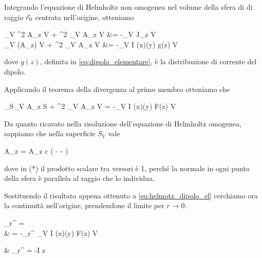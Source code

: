 Integrando l'equazione di Helmholtz non omogenea nel volume della sfera di di raggio $\vec{r}_0$ centrata nell'origine, otteniamo
\begin{esp*}
	\int_V \nabla^2 A_z \de V + \omega^2 \mu \epsilon \int_V A_z \de V &= -\mu \int_V J_z \de V \\
	\int_V \diverg(\nabla A_z) \de V + \omega^2 \mu \epsilon \int_V A_z \de V &= -\mu \int_V I \delta(x)\delta(y) g(z) \de V
\end{esp*}
dove $g(z)$, definita in \autoref{eq:dipolo_elementare}, è la distribuzione di corrente del dipolo.

Applicando il teorema della divergenza al primo membro otteniamo che
\begin{esp} \label{eq:helmotz_dipolo_el}
	\int_{S_V} \nabla A_z  \de S
	+ \omega^2 \mu \epsilon \int_V A_z \de V
	= -\mu \int_V I \delta(x)\delta(y) F(z) \de V \\
\end{esp}

Da quanto ricavato nella risoluzione dell'equazione di Helmholtz omogenea, sappiamo che nella superficie $S_V$ vale
\begin{esp*}
	\nabla A_z \cdot {}
	=  A_z  \cdot {}
	\stackrel{(*)}{=} c \left(
			-\jmath \beta {}
			- 
		\right)
\end{esp*}
dove in (*) il prodotto scalare tra versori è 1, perché la normale in ogni punto della sfera è parallela al raggio che lo individua.

Sostituendo il risultato appena ottenuto a \autoref{eq:helmotz_dipolo_el} cerchiamo ora la continuità nell'origine, prendendone il limite per $r \to 0$.

\begin{esp*}
	\lim_{r^\prime {}}  = \\
	& = -\mu \lim_{r^\prime {}} \int_V I \delta(x)\delta(y) F(z) \de V \\
\end{esp*}

\begin{esp*}
	& \lim_{r^\prime {}} 
	= -\mu I \Delta z \\
\end{esp*}

